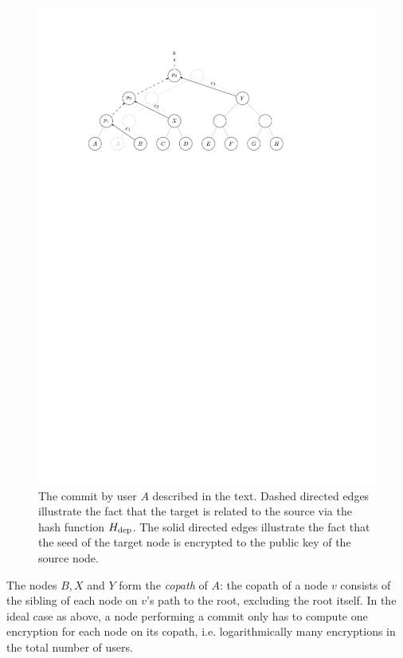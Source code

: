 \begin{figure}
	\begin{center}
		\includegraphics{figures/treekem-simple-update}
	\end{center}
	\caption{The commit by user $A$ described in the text. Dashed directed edges illustrate the fact that the target is related to the source via the hash function $H_\mathrm{dep}$. The solid directed edges illustrate the fact that the seed of the target node is encrypted to the public key of the source node.}\label{fig:treekem-simple-update}
\end{figure}

The nodes $B, X$ and $Y$ form the \emph{copath} of $A$: the copath of a node $v$ consists of the sibling of each node on $v$'s path to the root, excluding the root itself. In the ideal case as above, a node performing a commit only has to compute one encryption for each node on its copath, i.e. logarithmically many encryptions in the total number of users.


